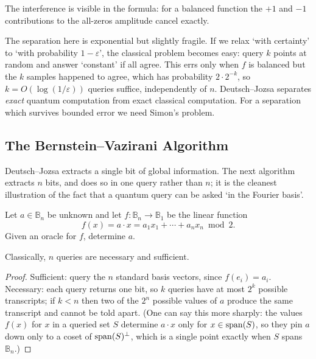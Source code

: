 \documentclass[a4paper]{scrartcl}
\newcommand{\bits}[1]{\mathbb{B}_{#1}}
\begin{document}
The interference is visible in the formula: for a balanced function the $+1$ and $-1$ contributions to the all-zeros amplitude cancel exactly.

\begin{remark}
	The separation here is exponential but slightly fragile. If we relax `with certainty' to `with probability $1-\varepsilon$', the classical problem becomes easy: query $k$ points at random and answer `constant' if all agree. This errs only when $f$ is balanced but the $k$ samples happened to agree, which has probability $2\cdot2^{-k}$, so $k = O(\log(1/\varepsilon))$ queries suffice, independently of $n$. Deutsch--Jozsa separates \emph{exact} quantum computation from exact classical computation. For a separation which survives bounded error we need Simon's problem.
\end{remark}

\subsection{The Bernstein--Vazirani Algorithm}\label{sec:bv}

Deutsch--Jozsa extracts a single bit of global information. The next algorithm extracts $n$ bits, and does so in one query rather than $n$; it is the cleanest illustration of the fact that a quantum query can be asked `in the Fourier basis'.

\begin{problem*}
	Let $a\in\bits n$ be unknown and let $f:\bits n\to\bits1$ be the linear function
	$$f(x) = a\cdot x = a_1x_1+\cdots+a_nx_n \bmod 2.$$
	Given an oracle for $f$, determine $a$.
\end{problem*}

\begin{proposition}
	Classically, $n$ queries are necessary and sufficient.
\end{proposition}

\begin{proof}
	Sufficient: query the $n$ standard basis vectors, since $f(e_i) = a_i$. Necessary: each query returns one bit, so $k$ queries have at most $2^k$ possible transcripts; if $k<n$ then two of the $2^n$ possible values of $a$ produce the same transcript and cannot be told apart. (One can say this more sharply: the values $f(x)$ for $x$ in a queried set $S$ determine $a\cdot x$ only for $x\in\operatorname{span}(S)$, so they pin $a$ down only to a coset of $\operatorname{span}(S)^\perp$, which is a single point exactly when $S$ spans $\bits n$.)
\end{proof}
\end{document}
